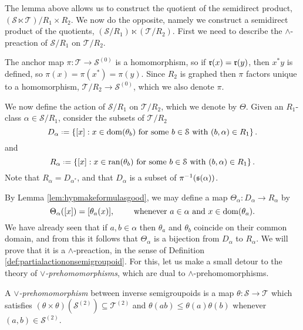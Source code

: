 The lemma above allows us to construct the quotient of the semidirect product, $(\mathcal{S}\ltimes\mathcal{T})/R_1\times R_2$. We now do the opposite, namely we construct a semidirect product of the quotients, $(\mathcal{S}/R_1)\ltimes(\mathcal{T}/R_2)$. First we need to describe the $\land$-preaction of $\mathcal{S}/R_1$ on $\mathcal{T}/R_2$.

The anchor map $\pi\colon\mathcal{T}\to\mathcal{S}^{(0)}$ is a homomorphism, so if $\operatorname{\mathfrak{r}}(x)=\operatorname{\mathfrak{r}}(y)$, then $x^*y$ is defined, so $\pi(x)=\pi(x^*)=\pi(y)$. Since $R_2$ is graphed then $\pi$ factors unique to a homomorphism, $\mathcal{T}/R_2\to\mathcal{S}^{(0)}$, which we also denote $\pi$.

We now define the action of $\mathcal{S}/R_1$ on $\mathcal{T}/R_2$, which we denote by $\Theta$. Given an $R_1$-class $\alpha\in\mathcal{S}/R_1$, consider the subsets of $\mathcal{T}/R_2$
\[D_\alpha\defeq\left\{[x]:x\in\dom(\theta_b)\text{ for some }b\in\mathcal{S}\text{ with }(b,\alpha)\in R_1\right\}.\]
and
\[R_\alpha\defeq\left\{[x]:x\in\ran(\theta_b)\text{ for some }b\in\mathcal{S}\text{ with }(b,\alpha)\in R_1\right\}.\]
Note that $R_\alpha=D_{\alpha^*}$, and that $D_\alpha$ is a subset of $\pi^{-1}(\operatorname{\mathfrak{s}}(\alpha))$.

By Lemma \ref{lem:hypmakeformulasgood}, we may define a map $\Theta_{\alpha}\colon D_\alpha\to R_\alpha$ by
\[\Theta_\alpha([x])=[\theta_a(x)],\qquad\text{ whenever }a\in\alpha\text{ and }x\in\operatorname{dom}(\theta_a).\]
We have already seen that if $a,b\in\alpha$ then $\theta_a$ and $\theta_b$ coincide on their common domain, and from this it follows that $\Theta_\alpha$ is a bijection from $D_\alpha$ to $R_\alpha$. We will prove that it is a $\land$-preaction, in the sense of Definition \ref{def:partialactiononsemigroupoid}. For this, let us make a small detour to the theory of \emph{$\lor$-prehomomorphisms}, which are dual to $\land$-prehomomorphisms.

\begin{definition}
A \emph{$\lor$-prehomomorphism} between inverse semigroupoids is a map $\theta\colon\mathcal{S}\to\mathcal{T}$ which satisfies $(\theta\times\theta)(\mathcal{S}^{(2)})\subseteq\mathcal{T}^{(2)}$ and $\theta(ab)\leq\theta(a)\theta(b)$ whenever $(a,b)\in\mathcal{S}^{(2)}$.
\end{definition}

